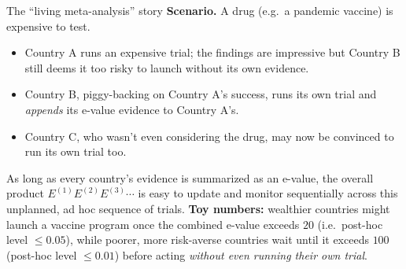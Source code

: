 \documentclass[aspectratio=169,10pt]{beamer}
\begin{document}
\begin{frame}{The ``living meta-analysis'' story}
  \textbf{Scenario.} A drug (e.g.\ a pandemic vaccine) is expensive to test.
  \begin{itemize}
    \item Country A runs an expensive trial; the findings are impressive but
    Country B still deems it too risky to launch without its own evidence.
    \item Country B, piggy-backing on Country A's success, runs its own
    trial and \emph{appends} its e-value evidence to Country A's.
    \item Country C, who wasn't even considering the drug, may now be
    convinced to run its own trial too.
  \end{itemize}
  As long as every country's evidence is summarized as an e-value, the
  overall product $E^{(1)}E^{(2)}E^{(3)}\cdots$ is easy to update and
  monitor sequentially across this unplanned, ad hoc sequence of trials.
  \textbf{Toy numbers:} wealthier countries might launch a vaccine program
  once the combined e-value exceeds $20$ (i.e.\ post-hoc level $\le0.05$),
  while poorer, more risk-averse countries wait until it exceeds $100$
  (post-hoc level $\le0.01$) before acting \emph{without even running their
  own trial}.
\end{frame}
\end{document}
